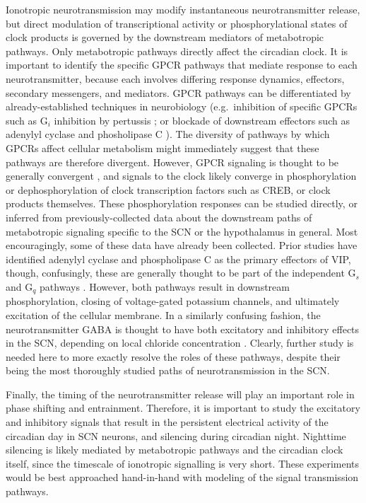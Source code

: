 Ionotropic neurotransmission may modify instantaneous neurotransmitter release, but direct modulation of transcriptional activity or phosphorylational states of clock products is governed by the downstream mediators of metabotropic pathways.
Only metabotropic pathways directly affect the circadian clock.
It is important to identify the specific GPCR pathways that mediate response to each neurotransmitter, because each involves differing response dynamics, effectors, secondary messengers, and mediators.
GPCR pathways can be differentiated by already-established techniques in neurobiology (e.g.\ inhibition of specific GPCRs such as G$_i$ inhibition by pertussis \cite{Aton2006}; or blockade of downstream effectors such as adenylyl cyclase and phosholipase C \cite{An2011}).
The diversity of pathways by which GPCRs affect cellular metabolism might immediately suggest that these pathways are therefore divergent.
However, GPCR signaling is thought to be generally convergent \cite{fain1999}, and signals to the clock likely converge in phosphorylation or dephosphorylation of clock transcription factors such as CREB, or clock products themselves.
These phosphorylation responses can be studied directly, or inferred from previously-collected data about the downstream paths of metabotropic signaling specific to the SCN or the hypothalamus in general.
Most encouragingly, some of these data have already been collected.
Prior studies have identified adenylyl cyclase and phospholipase C as the primary effectors of VIP, though, confusingly, these are generally thought to be part of the independent G$_s$ and G$_q$ pathways \cite{fain1999, An2011}.
However, both pathways result in downstream phosphorylation, closing of voltage-gated potassium channels, and ultimately excitation of the cellular membrane.
In a similarly confusing fashion, the neurotransmitter GABA is thought to have both excitatory and inhibitory effects in the SCN, depending on local chloride concentration \cite{DeWoskin2015}.
Clearly, further study is needed here to more exactly resolve the roles of these pathways, despite their being the most thoroughly studied paths of neurotransmission in the SCN.

Finally, the timing of the neurotransmitter release will play an important role in phase shifting and entrainment.
Therefore, it is important to study the excitatory and inhibitory signals that result in the persistent electrical activity of the circadian day in SCN neurons, and silencing during circadian night.
Nighttime silencing is likely mediated by metabotropic pathways and the circadian clock itself, since the timescale of ionotropic signalling is very short.
These experiments would be best approached hand-in-hand with modeling of the signal transmission pathways.

